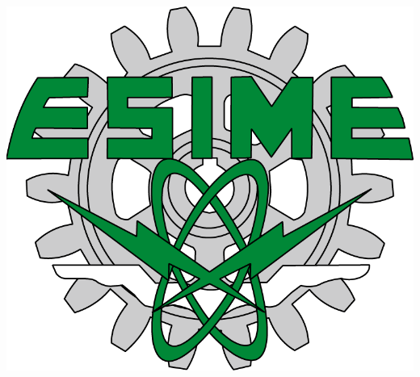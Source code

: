 \begin{minipage}[c][0.81\textheight][t]{0.22\textwidth}
	\begin{center}
		\color{Black}\vrule width1pt height16cm 
		\vspace{5mm}
		\hskip2pt
		\color{Black}\vrule width1pt height16cm
		\hskip2mm
		\color{Black}\vrule width1pt height16cm \\
		\includegraphics[scale=0.14]{recursos/esime.png}
	\end{center}
\end{minipage}
